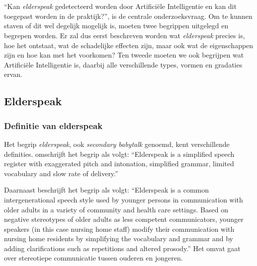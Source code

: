 \chapter{}
\label{ch:stand-van-zaken}



``Kan \textit{elderspeak} gedetecteerd worden door Artificiële Intelligentie en kan dit toegepast worden in de praktijk?'', is de centrale onderzoeksvraag.
Om te kunnen staven of dit wel degelijk mogelijk is, moeten twee begrippen uitgelegd en begrepen worden.
Er zal dus eerst beschreven worden wat \textit{elderspeak} precies is, hoe het ontstaat, wat de schadelijke effecten zijn, maar ook wat de eigenschappen zijn en hoe kan met het voorkomen?
Ten tweede moeten we ook begrijpen wat Artificiële Intelligentie is, daarbij alle verschillende types, vormen en gradaties ervan.

\section{Elderspeak}

\subsection{Definitie van elderspeak}

Het begrip \textit{elderspeak}, ook \textit{secondary babytalk} genoemd, kent verschillende definities. \textcite{Kemper1998} omschrijft het begrip als volgt:
``Elderspeak is a simplified speech register with exaggerated pitch and intonation, simplified grammar, limited vocabulary and slow rate of delivery.''

Daarnaast beschrijft \textcite{Williams2011} het begrip als volgt:
``Elderspeak is a common intergenerational speech style used by younger persons in communication with older adults in a variety of community and health care settings. Based on negative stereotypes of older adults as less competent communicators, younger speakers (in this case nursing home staff) modify their communication with nursing home residents by simplifying the vocabulary and grammar and by adding clarifications such as repetitions and altered prosody.'' Het omvat gaat over stereotiepe communicatie tussen ouderen en jongeren.

